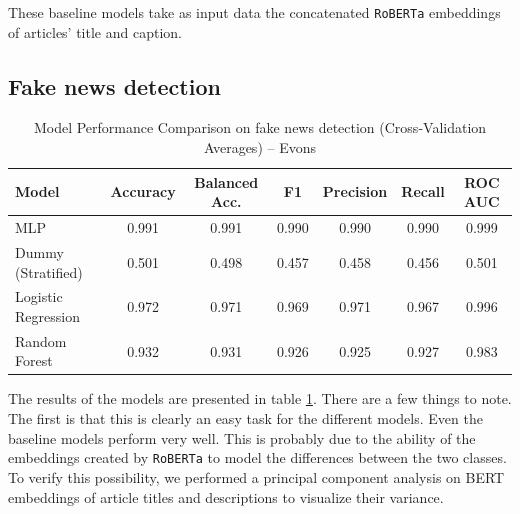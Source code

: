 \documentclass[a4paper,twoside,12pt]{book}
\begin{document}
These baseline models take as input data the concatenated \texttt{RoBERTa} embeddings of articles' title and caption.

\subsection{Fake news detection}

\begin{table}[h!]
	\centering
	\caption{Model Performance Comparison  on fake news detection (Cross-Validation Averages) -- Evons}
	\label{tab:results_evons_detection}
	\vspace{0.5em}
	\begin{tabular}{lcccccc}
		\hline
		\textbf{Model} & \textbf{Accuracy} & \textbf{Balanced Acc.} & \textbf{F1} & \textbf{Precision} & \textbf{Recall} & \textbf{ROC AUC} \\
		\hline
		MLP & 0.991 & 0.991 & 0.990 & 0.990 & 0.990 & 0.999 \\
		\hline
		Dummy (Stratified)        & 0.501 & 0.498 & 0.457 & 0.458 & 0.456 & 0.501 \\
		Logistic Regression       & 0.972 & 0.971 & 0.969 & 0.971 & 0.967 & 0.996 \\
		Random Forest             & 0.932 & 0.931 & 0.926 & 0.925 & 0.927 & 0.983 \\
		\hline
	\end{tabular}
\end{table}

The results of the models are presented in table \ref{tab:results_evons_detection}. There are a few things to note. The first is that this is clearly an easy task for the different models. Even the baseline models perform very well. This is probably due to the ability of the embeddings created by \texttt{RoBERTa} to model the differences between the two classes. To verify this possibility, we performed a principal component analysis on BERT embeddings of article titles and descriptions to visualize their variance. 
\end{document}
